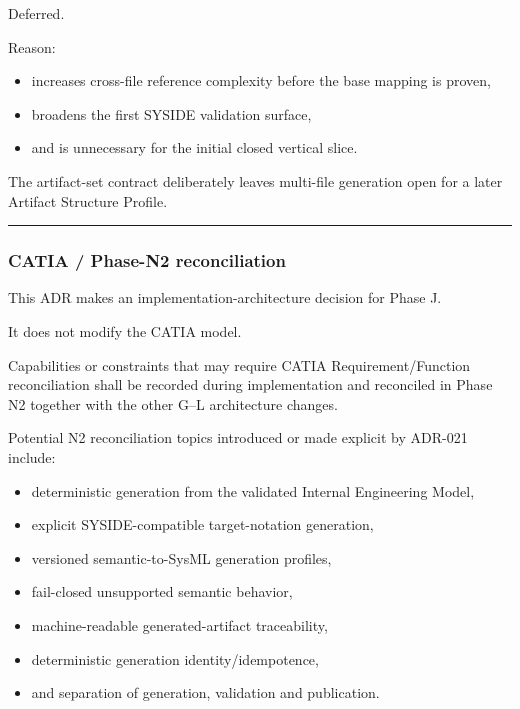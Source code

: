 Deferred.

Reason:

\begin{itemize}
\tightlist
\item
  increases cross-file reference complexity before the base mapping is proven,
\item
  broadens the first SYSIDE validation surface,
\item
  and is unnecessary for the initial closed vertical slice.
\end{itemize}

The artifact-set contract deliberately leaves multi-file generation open for a later Artifact Structure Profile.

\begin{center}\rule{0.5\linewidth}{0.5pt}\end{center}

\hypertarget{catia--phase-n2-reconciliation}{%
\subsubsection{CATIA / Phase-N2 reconciliation}\label{catia--phase-n2-reconciliation}}

This ADR makes an implementation-architecture decision for Phase J.

It does not modify the CATIA model.

Capabilities or constraints that may require CATIA Requirement/Function reconciliation shall be recorded during implementation and reconciled in Phase N2 together with the other G--L architecture changes.

Potential N2 reconciliation topics introduced or made explicit by ADR-021 include:

\begin{itemize}
\tightlist
\item
  deterministic generation from the validated Internal Engineering Model,
\item
  explicit SYSIDE-compatible target-notation generation,
\item
  versioned semantic-to-SysML generation profiles,
\item
  fail-closed unsupported semantic behavior,
\item
  machine-readable generated-artifact traceability,
\item
  deterministic generation identity/idempotence,
\item
  and separation of generation, validation and publication.
\end{itemize}

